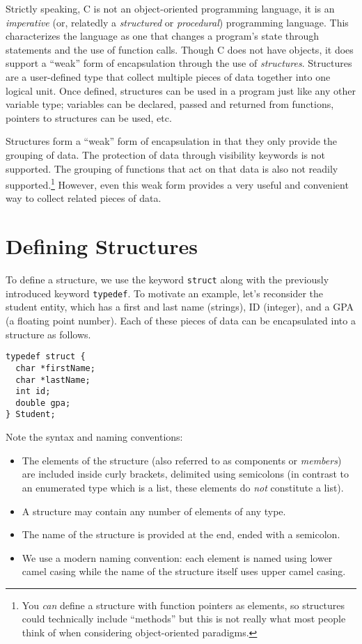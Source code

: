 

Strictly speaking, C is not an object-oriented programming language, 
it is an \emph{imperative} (or, relatedly a \emph{structured} or 
\emph{procedural}) programming language.  This characterizes the
language as one that changes a program's state through statements
and the use of function calls.  Though C does not have objects, it
does support a ``weak'' form of encapsulation through the use
of \emph{structures}.  Structures are a user-defined type that 
collect multiple pieces of data together into one logical unit.
Once defined, structures can be used in a program just like any
other variable type; variables can be declared, passed and returned
from functions, pointers to structures can be used, etc.

Structures form a ``weak'' form of encapsulation in that they only
provide the grouping of data.  The protection of data through 
visibility keywords is not supported.  The grouping of functions
that act on that data is also not readily supported.\footnote{You
\emph{can} define a structure with function pointers as elements, 
so structures could technically include ``methods'' but this is
not really what most people think of when considering object-oriented
paradigms.}  However, even this weak form provides a very useful
and convenient way to collect related pieces of data.

\section{Defining Structures}

To define a structure, we use the keyword \texttt{struct}
along with the previously introduced keyword \texttt{typedef}.
To motivate an example, let's reconsider the student entity, which
has a first and last name (strings), ID (integer), and a GPA 
(a floating point number).  Each of these pieces of data can be
encapsulated into a structure as follows.

\begin{verbatim}
typedef struct {
  char *firstName;
  char *lastName;
  int id;
  double gpa;
} Student;
\end{verbatim}

Note the syntax and naming conventions:
\begin{itemize}
  \item The elements of the structure (also referred to as components 
    or \emph{members}) are included inside curly brackets, 
  	delimited using semicolons (in contrast to an enumerated type which 
	is a list, these elements do \emph{not} constitute a list).
  \item A structure may contain any number of elements of any type.
  \item The name of the structure is provided at the end, ended with
  	a semicolon.
  \item We use a modern naming convention: each element is named
  	using lower camel casing while the name of the structure itself
	uses upper camel casing.
\end{itemize}

